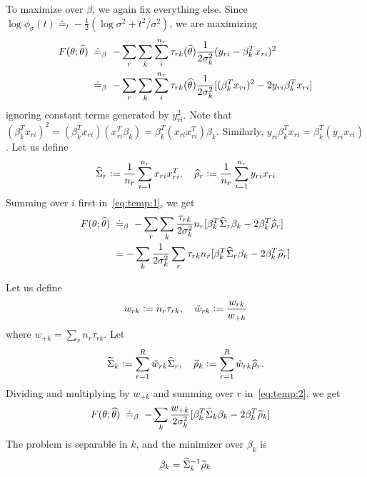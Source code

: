 \documentclass[12pt]{article}
\begin{document}
\begin{appendices}
	To maximize over $\beta$, we again fix everything else. Since $\log \phi_\sigma(t) \doteq_t -\frac12 (\log \sigma^2 + t^2/\sigma^2) $, we are maximizing
	\begin{align}
	    F(\theta;\widehat\theta)\; &\doteq_\beta\; -\sum_r \sum_k \sum_i^{n_r} 
	    \tau_{rk}(\widehat\theta) \frac1{2\sigma_k^2} (y_{ri} - \beta_k^T x_{ri})^2 \\
	    &\doteq_\beta\; -\sum_r \sum_k \sum_i^{n_r} 
	    \tau_{rk}(\widehat\theta) \frac1{2\sigma_k^2} [(\beta_k^T x_{ri})^2 - 2y_{ri}\beta_k^T x_{ri}] \label{eq:temp:1}
	\end{align}
	ignoring constant terms generated by $y_{ri}^2$. Note that $(\beta_k^T x_{ri})^2 = (\beta_k^T x_{ri})(x_{ri}^T \beta_k) = \beta_k^T (x_{ri}x_{ri}^T) \beta_k$. Similarly, $y_{ri}\beta_k^T x_{ri} = \beta_k^T(y_{ri} x_{ri})$. Let us define
	\begin{align}\label{eq:hat:def}
	    \widehat{\Sigma}_r := \frac1{n_r}\sum_{i=1}^{n_r} x_{ri} x_{ri}^T, \quad 
	    \widehat\rho_r :=  \frac1{n_r}\sum_{i=1}^{n_r} y_{ri} x_{ri}
	\end{align}
	Summing over $i$ first in~\eqref{eq:temp:1}, we get
	\begin{align}
	     F(\theta;\widehat\theta)\; 
	    &\doteq_\beta\; -\sum_r \sum_k
	     \frac{\tau_{rk}}{2\sigma_k^2} n_r[ \beta_k^T \widehat{\Sigma}_r \beta_k - 2 \beta_k^T \widehat\rho_r] \notag \\
	    &=  - \sum_k \frac1{2\sigma_k^2}
	     \sum_r\tau_{rk} n_r[ \beta_k^T \widehat{\Sigma}_r \beta_k - 2 \beta_k^T \widehat\rho_r]
	     \label{eq:temp:2}
	\end{align}

	
	Let us define 
	\begin{align}\label{eq:w:def}
	    w_{rk} :=  n_r \tau_{rk}, \quad \check w_{rk} := \frac{w_{rk}}{w_{+k}}
	\end{align}
	 where $w_{+k} = \sum_r n_r\tau_{rk}$. Let
	\begin{align}\label{eq:tilde:def}
	    \widetilde{\Sigma}_k := \sum_{r=1}^R \check w_{rk} \widehat{\Sigma}_r, \quad 
	    \widetilde{\rho}_k := \sum_{r=1}^R \check w_{rk}  \widehat\rho_r.
	\end{align}
	Dividing and multiplying by $w_{+k}$ and summing over $r$ in~\eqref{eq:temp:2}, we get
	\begin{align}
	    F(\theta;\widehat\theta)\; 
	    &\doteq_\beta\; -\sum_k \frac{w_{+k}}{2\sigma_k^2} [\beta_k^T \widetilde{\Sigma}_k \beta_k - 2 \beta_k^T \widetilde{\rho}_k]
	\end{align}
	The problem is separable in $k$, and the minimizer over $\beta_k$ is
	\begin{align}
	    \beta_k = \widetilde{\Sigma}_k^{-1} \widetilde{\rho}_k
	\end{align}


\end{appendices}
\end{document}
